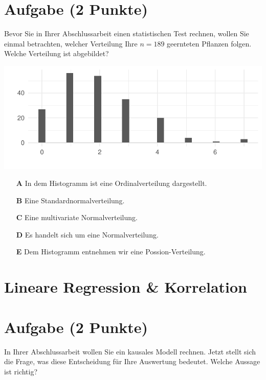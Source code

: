 \documentclass[a4paper, 9pt]{scrartcl}\usepackage[]{graphicx}\usepackage[]{xcolor}
\makeatletter
\def\maxwidth{ %
  \ifdim\Gin@nat@width>\linewidth
    \linewidth
  \else
    \Gin@nat@width
  \fi
}
\makeatother
\begin{document}
\section{Aufgabe \hfill (2 Punkte)}



Bevor Sie in Ihrer Abschlussarbeit einen statistischen Test rechnen, wollen Sie einmal betrachten, welcher Verteilung Ihre $n = 189$ geernteten Pflanzen folgen.  Welche Verteilung ist abgebildet?



{\centering \includegraphics[width=\maxwidth]{img/mc-distribution-02-a-1} 

}







\begin{enumerate}
\item [\textbf{A} \msquare] In dem Histogramm ist eine Ordinalverteilung dargestellt.
\item [\textbf{B} \msquare] Eine Standardnormalverteilung.
\item [\textbf{C} \msquare] Eine multivariate Normalverteilung.
\item [\textbf{D} \msquare] Es handelt sich um eine Normalverteilung.
\item [\textbf{E} \msquare] Dem Histogramm entnehmen wir eine Possion-Verteilung.
\end{enumerate} 
\section*{Lineare Regression \& Korrelation}

\section{Aufgabe \hfill (2 Punkte)}



In Ihrer Abschlussarbeit wollen Sie ein kausales Modell rechnen. Jetzt stellt sich die Frage, was diese Entscheidung für Ihre Auswertung bedeutet. Welche Aussage ist richtig?
\end{document}
